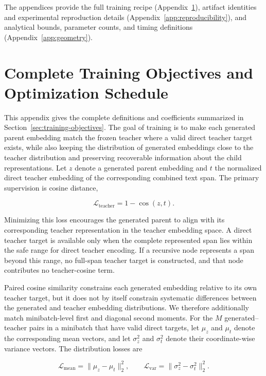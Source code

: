 \documentclass[10pt]{article}
\begin{document}
\appendix

The appendices provide the full training recipe
(Appendix~\ref{app:training-objectives}), artifact identities and experimental
reproduction details (Appendix~\ref{app:reproducibility}), and analytical
bounds, parameter counts, and timing definitions (Appendix~\ref{app:geometry}).

\section{Complete Training Objectives and Optimization Schedule}
\label{app:training-objectives}

This appendix gives the complete definitions and coefficients summarized in
Section~\ref{sec:training-objectives}.
The goal of training is to make each generated parent embedding match the frozen teacher where a valid direct teacher target exists, while also keeping the distribution of generated embeddings close to the teacher distribution and preserving recoverable information about the child representations. Let \(z\) denote a generated parent embedding and \(t\) the normalized direct teacher embedding of the corresponding combined text span. The primary supervision is cosine distance,

\[
\mathcal{L}_{\mathrm{teacher}}
=
1-\operatorname{cos}(z,t).
\]

Minimizing this loss encourages the generated parent to align with its corresponding teacher representation in the teacher embedding space. A direct teacher target is available only when the complete represented span lies within the safe range for direct teacher encoding. If a recursive node represents a span beyond this range, no full-span teacher target is constructed, and that node contributes no teacher-cosine term.

Paired cosine similarity constrains each generated embedding relative to its own teacher target, but it does not by itself constrain systematic differences between the generated and teacher embedding distributions. We therefore additionally match minibatch-level first and diagonal second moments. For the \(M\) generated--teacher pairs in a minibatch that have valid direct targets, let \(\mu_z\) and \(\mu_t\) denote the corresponding mean vectors, and let \(\sigma_z^2\) and \(\sigma_t^2\) denote their coordinate-wise variance vectors. The distribution losses are

\[
\mathcal{L}_{\mathrm{mean}}
=
\lVert \mu_z-\mu_t\rVert_2^2,
\qquad
\mathcal{L}_{\mathrm{var}}
=
\lVert \sigma_z^2-\sigma_t^2\rVert_2^2.
\]
\end{document}
